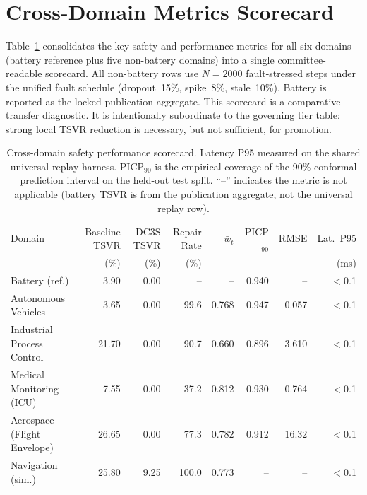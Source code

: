 \section{Cross-Domain Metrics Scorecard}
\label{sec:cross-domain-scorecard}

Table~\ref{tab:cross-domain-scorecard} consolidates the key safety and
performance metrics for all six domains (battery reference plus five
non-battery domains) into a single committee-readable scorecard.  All
non-battery rows use $N = 2000$ fault-stressed steps under the unified
fault schedule (dropout~15\%, spike~8\%, stale~10\%).  Battery is
reported as the locked publication aggregate.  This scorecard is a
comparative transfer diagnostic.  It is intentionally subordinate to the
governing tier table: strong local TSVR reduction is necessary, but not
sufficient, for promotion.

\begin{table}[htbp]
\centering
\caption{Cross-domain safety performance scorecard.  Latency P95 measured
  on the shared universal replay harness.  PICP$_{90}$ is the empirical
  coverage of the 90\% conformal prediction interval on the held-out test
  split.  ``--'' indicates the metric is not applicable (battery TSVR is
  from the publication aggregate, not the universal replay row).}
\label{tab:cross-domain-scorecard}
\begin{tabular}{lrrrrrrr}
\toprule
Domain & Baseline TSVR & DC3S TSVR & Repair Rate & $\bar{w}_t$ & PICP$_{90}$ & RMSE & Lat.\ P95 \\
 & (\%) & (\%) & (\%) & & & & (ms) \\
\midrule
Battery (ref.)              & 3.90  & 0.00  & --    & --    & 0.940 & --     & $<$0.1 \\
Autonomous Vehicles         & 3.65  & 0.00  & 99.6  & 0.768 & 0.947 & 0.057  & $<$0.1 \\
Industrial Process Control  & 21.70 & 0.00  & 90.7  & 0.660 & 0.896 & 3.610  & $<$0.1 \\
Medical Monitoring (ICU)    & 7.55  & 0.00  & 37.2  & 0.812 & 0.930 & 0.764  & $<$0.1 \\
Aerospace (Flight Envelope) & 26.65 & 0.00  & 77.3  & 0.782 & 0.912 & 16.32  & $<$0.1 \\
Navigation (sim.)           & 25.80 & 9.25  & 100.0 & 0.773 & --    & --     & $<$0.1 \\
\bottomrule
\end{tabular}
\end{table}

